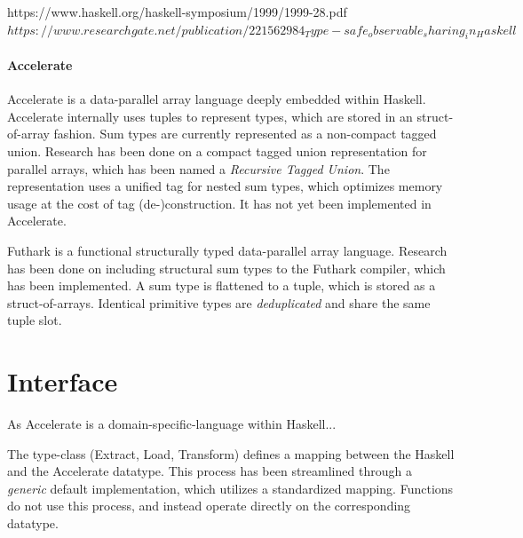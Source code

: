 \documentclass{article}
\newcommand{\type}[1]{\smash{\colorbox{codegray}{\texttt{#1}}}}
\begin{document}
https://www.haskell.org/haskell-symposium/1999/1999-28.pdf
$https://www.researchgate.net/publication/221562984_Type-safe_observable_sharing_in_Haskell$


\paragraph{Accelerate}

Accelerate is a data-parallel array language deeply embedded within Haskell.
Accelerate internally uses tuples to represent types, which are stored in an struct-of-array fashion.
Sum types are currently represented as a non-compact tagged union.
Research has been done on a compact tagged union representation for parallel arrays, which has been named a {\it Recursive Tagged Union}\cite{accelerate-sum-types}.
The representation uses a unified tag for nested sum types, which optimizes memory usage at the cost of tag (de-)construction.  
It has not yet been implemented in Accelerate.

Futhark is a functional structurally typed data-parallel array language.
Research has been done on including structural sum types to the Futhark compiler\cite{futhark-sum-types}, which has been implemented.
A sum type is flattened to a tuple, which is stored as a struct-of-arrays. 
Identical primitive types are {\it deduplicated} and share the same tuple slot.


\section{Interface}

As Accelerate is a domain-specific-language within Haskell...

The \type{Elt} type-class (Extract, Load, Transform) defines a mapping between the Haskell and the Accelerate datatype.
This process has been streamlined through a {\it generic} default implementation, which utilizes a standardized mapping.
Functions do not use this process, and instead operate directly on the corresponding datatype.


\newpage



\end{document}

